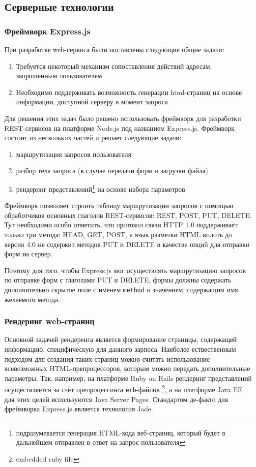 \documentclass[12pt, a4paper]{article}
\begin{document}
\subsection{Серверные технологии}

\subsubsection{Фреймворк Express.js}
При разработке web-сервиса были поставлены следующие общие задачи:
\begin{enumerate}
    \item Требуется некоторый механизм сопоставления действий адресам, запрошенным
    пользователем
    \item Необходимо поддерживать возможность генерации html-страниц на основе
    информации, доступной серверу в момент запроса
\end{enumerate}

Для решения этих задач было решено использовать фреймворк для разработки
REST-сервисов на платформе Node.js под названием Express.js. Фреймворк состоит
из нескольких частей и решает следующие задачи:
\begin{enumerate}
    \item маршрутизация запросов пользователя
    \item разбор тела запроса (в случае передачи форм и загрузки файла)
    \item рендеринг представлений\footnote{подразумевается генерация HTML-кода
    веб-страниц, который будет в дальнейшем отправлен в ответ на запрос
    пользователя} на основе набора параметров
\end{enumerate}

Фреймворк позволяет строить таблицу маршрутизации запросов с помощью
обработчиков основных глаголов REST-сервисов: REST, POST, PUT, DELETE. Тут
необходимо особо отметить, что протокол связи HTTP 1.0 поддерживает только три
метода: HEAD, GET, POST, а язык разметки HTML вплоть до версии 4.0 не содержит
методов PUT и DELETE в качестве опций для отправки форм на сервер.

Поэтому для того, чтобы Express.js мог осуществлять маршрутизацию запросов по
отправке форм с глаголами PUT и DELETE, формы должны содержать дополнительно
скрытое поле с именем \texttt{method} и значением, содержащим имя желаемого
метода.

\subsubsection{Рендеринг web-страниц}
Основной задачей рендеренга является формирование страницы, содержащей
информацию, специфическую для данного зарпоса. Наиболее ествественным подходом
для создания таких страниц можно считать использование всевозможных
HTML-препроцессоров, которым можно передать дополнительные параметры.
Так, например, на платформе Ruby on Rails рендеринг представлений осуществляется
за счет препроцессинга \texttt{erb}-файлов \footnote{embedded ruby file}, а на
платформе Java EE для этих целей используются Java Server Pages. Стандартом
де-факто для фреймворка Express.js является технология Jade.
\end{document}
